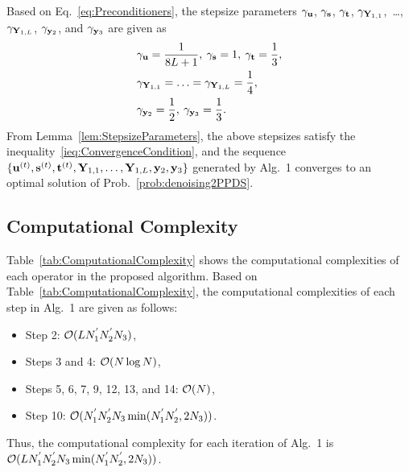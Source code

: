 Based on Eq.~\eqref{eq:Preconditioners}, the stepsize parameters $\gamma_{\mathbf{u}}$, $\gamma_{\mathbf{s}}$, $\gamma_{\mathbf{t}}$, $\gamma_{\mathbf{Y}_{1, 1}}$,~\ldots,~$\gamma_{\mathbf{Y}_{1, L}}$, $\gamma_{\mathbf{y}_{2}}$, and $\gamma_{\mathbf{y}_{3}}$ are given as
\begin{align}
	\label{eq:stepsize_denoising}
	& \gamma_{\mathbf{u}} = \frac{1}{8 L + 1}, \: \gamma_{\mathbf{s}} = 1, \: \gamma_{\mathbf{t}} = \frac{1}{3}, \nonumber \\
	& \gamma_{\mathbf{Y}_{1, 1}} = \ldots= \gamma_{\mathbf{Y}_{1, L}} = \frac{1}{4}, \nonumber \\
	& \gamma_{\mathbf{y}_{2}} = \frac{1}{2}, \: \gamma_{\mathbf{y}_{3}} = \frac{1}{3}.
\end{align}
From Lemma~\ref{lem:StepsizeParameters}, the above stepsizes satisfy the inequality~\eqref{ieq:ConvergenceCondition}, and the sequence $\{\mathbf{u}^{(t)}, \mathbf{s}^{(t)}, \mathbf{t}^{(t)}, \mathbf{Y}_{1,1}, \ldots , \mathbf{Y}_{1,L}, \mathbf{y}_{2}, \mathbf{y}_{3} \}$ generated by Alg.~1 converges to an optimal solution of Prob.~\eqref{prob:denoising2PPDS}.


\subsection{Computational Complexity}
\label{subsec:Comp_Comp}
Table~\ref{tab:ComputationalComplexity} shows the computational complexities of each operator in the proposed algorithm. Based on Table~\ref{tab:ComputationalComplexity}, the computational complexities of each step in Alg.~1 are given as follows:
\begin{itemize}
	\item Step 2: $\mathcal{O} (L N_{1}^{'} N_{2}^{'} N_{3})$,
	\item Steps 3 and 4: $\mathcal{O} (N \log{N})$,
	\item Steps 5, 6, 7, 9, 12, 13, and 14: $\mathcal{O} (N)$,
	\item Step 10: $\mathcal{O} (N_{1}^{'} N_{2}^{'} N_{3} \min({N_{1}^{'} N_{2}^{'}, 2 N_{3}}))$.
\end{itemize}
Thus, the computational complexity for each iteration of Alg.~1 is $\mathcal{O} (L N_{1}^{'} N_{2}^{'} N_{3} \min({N_{1}^{'} N_{2}^{'}, 2 N_{3}}))$.





